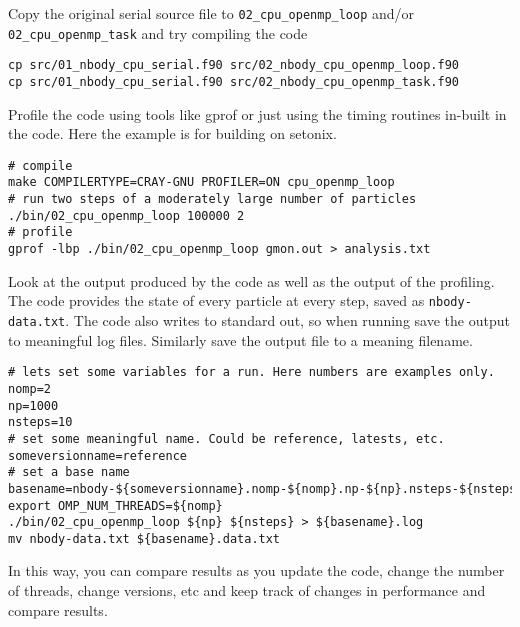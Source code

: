 \documentclass[11pt]{amsart}
\begin{document}
Copy the original serial source file to \texttt{02\_cpu\_openmp\_loop} and/or \texttt{02\_cpu\_openmp\_task} and try compiling the code
\begin{center}
\begin{minipage}{0.95\textwidth}
\begin{verbatim}
cp src/01_nbody_cpu_serial.f90 src/02_nbody_cpu_openmp_loop.f90
cp src/01_nbody_cpu_serial.f90 src/02_nbody_cpu_openmp_task.f90
\end{verbatim}
\end{minipage}
\end{center}
Profile the code using tools like gprof or just using the timing routines in-built in the code. 
Here the example is for building on setonix.
\begin{center}
\begin{minipage}{0.95\textwidth}
\begin{verbatim}
# compile
make COMPILERTYPE=CRAY-GNU PROFILER=ON cpu_openmp_loop
# run two steps of a moderately large number of particles 
./bin/02_cpu_openmp_loop 100000 2
# profile
gprof -lbp ./bin/02_cpu_openmp_loop gmon.out > analysis.txt
\end{verbatim}
\end{minipage}
\end{center}
Look at the output produced by the code as well as the output of the profiling. The code provides the state of every particle at every step, saved as {\color{blue}\texttt{nbody-data.txt}}. The code also writes to standard out, so when running save the output to meaningful log files. Similarly save the output file to a meaning filename.
\begin{center}
\begin{minipage}{0.95\textwidth}
\begin{verbatim}
# lets set some variables for a run. Here numbers are examples only.
nomp=2
np=1000
nsteps=10
# set some meaningful name. Could be reference, latests, etc.
someversionname=reference
# set a base name
basename=nbody-${someversionname}.nomp-${nomp}.np-${np}.nsteps-${nsteps}
export OMP_NUM_THREADS=${nomp}
./bin/02_cpu_openmp_loop ${np} ${nsteps} > ${basename}.log
mv nbody-data.txt ${basename}.data.txt
\end{verbatim}
\end{minipage}
\end{center}
In this way, you can compare results as you update the code, change the number of threads, change versions, etc and keep track of changes in performance and compare results.
\end{document}

